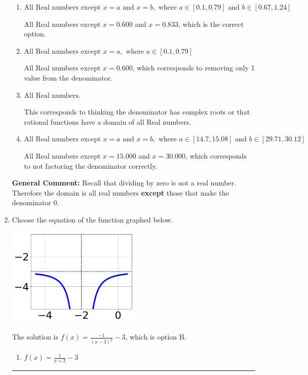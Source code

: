 \documentclass{extbook}[14pt]
\newcommand{\litem}[1]{\item #1

\rule{\textwidth}{0.4pt}}
\begin{document}
\begin{enumerate}
{\begin{enumerate}[label=\Alph*.]
All Real numbers except $x = 15.000$, which corresponds to removing a distractor value from the denominator.
\item \( \text{All Real numbers except } x = a \text{ and } x = b, \text{ where } a \in [0.1, 0.79] \text{ and } b \in [0.67, 1.24] \)

All Real numbers except $x = 0.600$ and $x = 0.833$, which is the correct option.
\item \( \text{All Real numbers except } x = a, \text{ where } a \in [0.1, 0.79] \)

All Real numbers except $x = 0.600$, which corresponds to removing only 1 value from the denominator.
\item \( \text{All Real numbers.} \)

This corresponds to thinking the denominator has complex roots or that rational functions have a domain of all Real numbers.
\item \( \text{All Real numbers except } x = a \text{ and } x = b, \text{ where } a \in [14.7, 15.08] \text{ and } b \in [29.71, 30.12] \)

All Real numbers except $x = 15.000$ and $x = 30.000$, which corresponds to not factoring the denominator correctly.
\end{enumerate}

\textbf{General Comment:} Recall that dividing by zero is not a real number. Therefore the domain is all real numbers \textbf{except} those that make the denominator 0.
}
\litem{
Choose the equation of the function graphed below.

\begin{center}
    \includegraphics[width=0.5\textwidth]{../Figures/rationalGraphToEquationCopyB.png}
\end{center}


The solution is \( f(x) = \frac{-1}{(x - 3)^2} - 3 \), which is option B.\begin{enumerate}[label=\Alph*.]
\item \( f(x) = \frac{1}{x + 3} - 3 \)


\end{enumerate}}
\end{enumerate}
\end{document}
